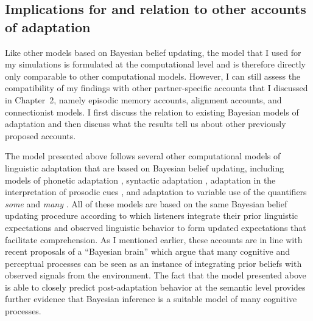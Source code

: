 \subsection{Implications for and relation to other accounts of adaptation}










Like other models based on Bayesian belief updating, the model that I used for my simulations
is formulated at the computational level \cite{Marr1982,Anderson1990} 
and is therefore directly only comparable to other computational models. However, I can still assess 
the compatibility of my findings with other partner-specific accounts that I discussed in Chapter~2, namely
episodic memory accounts, alignment accounts, and connectionist models. I first discuss the relation to existing Bayesian
 models of adaptation and then discuss what the results tell us about other previously proposed accounts. 
 
The model presented above follows several other computational models of linguistic adaptation that are based 
on Bayesian belief updating, including models of phonetic adaptation \cite{Kleinschmidt2015}, syntactic 
adaptation \cite{Kleinschmidt2012}, adaptation in the interpretation of prosodic cues \cite{Roettger2019},
and adaptation to variable use of the quantifiers \textit{some} and \textit{many} \cite{Qing2014}. 
All of these models are based on the same Bayesian belief updating procedure according to which listeners integrate
their prior linguistic expectations and observed linguistic behavior to form updated expectations that facilitate comprehension.
As I mentioned earlier, these accounts are in line with recent proposals of a ``Bayesian brain'' \parencite[e.g.,][]{Clark2013,Friston2010} which argue that
many cognitive and perceptual processes can be seen as an instance of integrating prior beliefs with observed signals from the environment. The 
fact that the model presented above is able to closely predict post-adaptation behavior at the semantic level provides further evidence 
that Bayesian inference is a suitable model of many cognitive processes.

